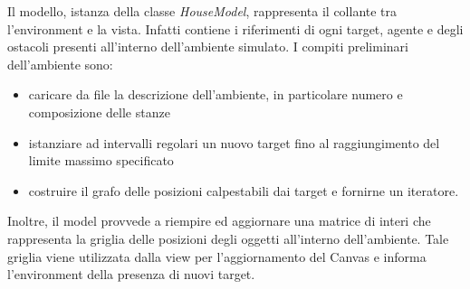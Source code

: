 Il modello, istanza della classe \textit{HouseModel}, rappresenta il collante tra l'environment e la vista. Infatti contiene i riferimenti di ogni target, agente e degli ostacoli presenti all'interno dell'ambiente simulato. 
I compiti preliminari dell'ambiente sono:
\begin{itemize}
	\item caricare da file la descrizione dell'ambiente, in particolare numero e composizione delle stanze
	\item istanziare ad intervalli regolari un nuovo target fino al raggiungimento del limite massimo specificato
	\item costruire il grafo delle posizioni calpestabili dai target e fornirne un iteratore.
\end{itemize}
Inoltre, il model provvede a riempire ed aggiornare una matrice di interi che rappresenta la griglia delle posizioni degli oggetti all'interno dell'ambiente. Tale griglia viene utilizzata dalla view per l'aggiornamento del Canvas e informa l'environment della presenza di nuovi target.